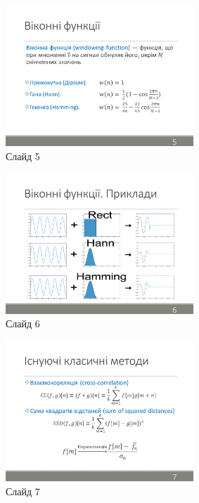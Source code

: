 \documentclass[pdftex]{thesis_utf8}
\begin{document}
\clearpage
\begin{figure}[h]
    \centering
    \includegraphics[width=0.63\textwidth]{slides/slide05.png}
    \caption{Слайд 5}
\end{figure}

\begin{figure}[h]
    \centering
    \includegraphics[width=0.63\textwidth]{slides/slide06.png}
    \caption{Слайд 6}
\end{figure}

\clearpage
\begin{figure}[h]
    \centering
    \includegraphics[width=0.63\textwidth]{slides/slide07.png}
    \caption{Слайд 7}
\end{figure}
\end{document}
